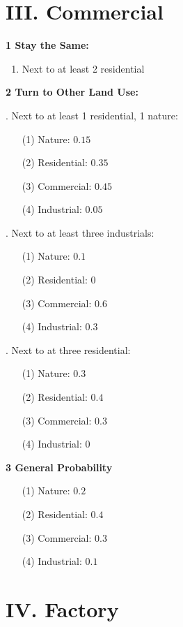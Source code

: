 \documentclass[a4paper,12pt]{report}
\begin{document}
\section*{III. Commercial}

\noindent
\textbf{1 Stay the Same: }

\begin{enumerate}
\item Next to at least 2 residential
\end{enumerate}

\noindent
\textbf{2 Turn to Other Land Use:}

. Next to at least 1 residential, 1 nature:
\begin{enumerate}
\item[(1)] Nature: $0.15$ 
\item[(2)] Residential: $0.35$
\item[(3)] Commercial: $0.45$
\item[(4)] Industrial: $0.05$
\end{enumerate}

. Next to at least three industrials:
\begin{enumerate}
\item[(1)] Nature: $0.1$ 
\item[(2)] Residential: $0$
\item[(3)] Commercial: $0.6$
\item[(4)] Industrial: $0.3$
\end{enumerate}

. Next to at three residential:
\begin{enumerate}
\item[(1)] Nature: $0.3$ 
\item[(2)] Residential: $0.4$
\item[(3)] Commercial: $0.3$
\item[(4)] Industrial: $0$
\end{enumerate}

\noindent
\textbf{3 General Probability}
\begin{enumerate}
\item[(1)] Nature: $0.2$ 
\item[(2)] Residential: $0.4$
\item[(3)] Commercial: $0.3$
\item[(4)] Industrial: $0.1$
\end{enumerate}

\section*{IV. Factory}
\end{document}
